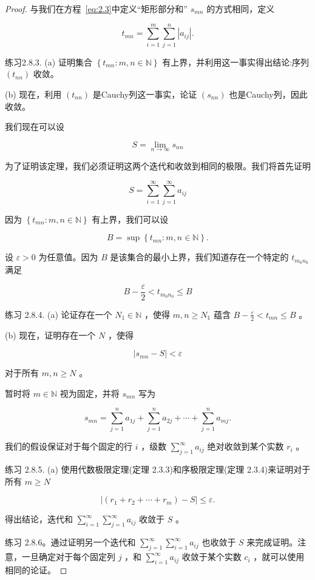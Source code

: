 \begin{proof}
  与我们在方程~\eqref{eq:2.3}中定义“矩形部分和” \({s}_{mn}\) 的方式相同，定义
  
\[
{t}_{mn} = \mathop{\sum }\limits_{{i = 1}}^{m}\mathop{\sum }\limits_{{j = 1}}^{n}\left| {a}_{ij}\right| .
\]

练习2.8.3. (a) 证明集合 \(\left\{  {{t}_{mn} : m,n \in  \mathbb{N}}\right\}\) 有上界，并利用这一事实得出结论:序列 \(\left( {t}_{nn}\right)\) 收敛。

(b) 现在，利用 \(\left( {t}_{nn}\right)\) 是Cauchy列这一事实，论证 \(\left( {s}_{nn}\right)\) 也是Cauchy列，因此收敛。

我们现在可以设

\[
S = \mathop{\lim }\limits_{{n \rightarrow  \infty }}{s}_{nn}
\]

为了证明该定理，我们必须证明这两个迭代和收敛到相同的极限。我们将首先证明

\[
S = \mathop{\sum }\limits_{{i = 1}}^{\infty }\mathop{\sum }\limits_{{j = 1}}^{\infty }{a}_{ij}
\]

因为 \(\left\{  {{t}_{mn} : m,n \in  \mathbb{N}}\right\}\) 有上界，我们可以设

\[
B = \sup \left\{  {{t}_{mn} : m,n \in  \mathbb{N}}\right\}  .
\]

设 \(\varepsilon  > 0\) 为任意值。因为 \(B\) 是该集合的最小上界，我们知道存在一个特定的 \({t}_{{m}_{0}{n}_{0}}\) 满足

\[
B - \frac{\varepsilon }{2} < {t}_{{m}_{0}{n}_{0}} \leq  B
\]

练习 2.8.4. (a) 论证存在一个 \({N}_{1} \in  \mathbb{N}\) ，使得 \(m,n \geq  {N}_{1}\) 蕴含 \(B - \frac{\varepsilon }{2} < {t}_{mn} \leq  B\) 。

(b) 现在，证明存在一个 \(N\) ，使得

\[
\left| {{s}_{mn} - S}\right|  < \varepsilon
\]

对于所有 \(m,n \geq  N\) 。

暂时将 \(m \in  \mathbb{N}\) 视为固定，并将 \({s}_{mn}\) 写为

\[
{s}_{mn} = \mathop{\sum }\limits_{{j = 1}}^{n}{a}_{1j} + \mathop{\sum }\limits_{{j = 1}}^{n}{a}_{2j} + \cdots  + \mathop{\sum }\limits_{{j = 1}}^{n}{a}_{mj}.
\]

我们的假设保证对于每个固定的行 \(i\) ，级数 \(\mathop{\sum }\limits_{{j = 1}}^{\infty }{a}_{ij}\) 绝对收敛到某个实数 \({r}_{i}\) 。

练习 2.8.5. (a) 使用代数极限定理(定理 2.3.3)和序极限定理(定理 2.3.4)来证明对于所有 \(m \geq  N\)

\[
\left| {\left( {{r}_{1} + {r}_{2} + \cdots  + {r}_{m}}\right)  - S}\right|  \leq  \varepsilon .
\]

得出结论，迭代和 \(\mathop{\sum }\limits_{{i = 1}}^{\infty }\mathop{\sum }\limits_{{j = 1}}^{\infty }{a}_{ij}\) 收敛于 \(S\) 。

练习 2.8.6。通过证明另一个迭代和 \(\mathop{\sum }\limits_{{j = 1}}^{\infty }\mathop{\sum }\limits_{{i = 1}}^{\infty }{a}_{ij}\) 也收敛于 \(S\) 来完成证明。注意，一旦确定对于每个固定列 \(j\) ，和 \(\mathop{\sum }\limits_{{i = 1}}^{\infty }{a}_{ij}\) 收敛于某个实数 \({c}_{i}\) ，就可以使用相同的论证。
\end{proof}




